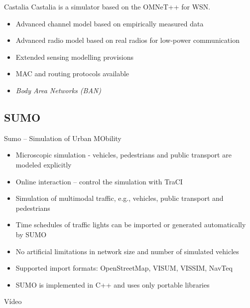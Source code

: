 \documentclass{beamer}
\begin{document}
\begin{frame}

\begin{block}{Castalia}
Castalia is a simulator based on the OMNeT++ for WSN.
	\begin{itemize}
		\item Advanced channel model based on empirically measured data
		\item Advanced radio model based on real radios for low-power communication
		\item Extended sensing modelling provisions
		\item MAC and routing protocols available
		\item \textit{Body Area Networks (BAN)}
	\end{itemize}
\end{block}
\end{frame}

\subsection{SUMO}

\begin{frame}

\begin{block}{Sumo -- Simulation of Urban MObility}

	\begin{itemize}
		\item Microscopic simulation - vehicles, pedestrians and public transport are modeled explicitly
		\item Online interaction – control the simulation with TraCI
		\item Simulation of multimodal traffic, e.g., vehicles, public transport and pedestrians
		\item Time schedules of traffic lights can be imported or generated automatically by SUMO
		\item No artificial limitations in network size and number of simulated vehicles
		\item Supported import formats: OpenStreetMap, VISUM, VISSIM, NavTeq
		\item SUMO is implemented in C++ and uses only portable libraries
	\end{itemize}

\end{block}
\end{frame}

\begin{frame}

\begin{exampleblock}{Vídeo}
	\centering
\end{exampleblock}

\end{frame}
\end{document}

